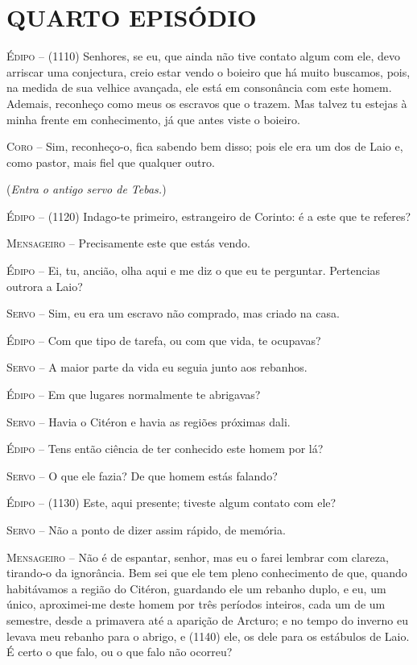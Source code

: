 \section{QUARTO EPISÓDIO}

\textsc{Édipo} --   (1110) Senhores, se eu, que ainda não tive contato algum com ele, devo
arriscar uma conjectura, creio estar vendo o boieiro que há muito
buscamos, pois, na medida de sua velhice avançada, ele está em
consonância com este homem. Ademais, reconheço como meus os escravos que
o trazem. Mas talvez tu estejas à minha frente em conhecimento, já que
antes viste o boieiro.

\textsc{Coro} --   Sim, reconheço-o, fica sabendo bem disso; pois ele era um dos de Laio e,
como pastor, mais fiel que qualquer outro.

(\emph{Entra o antigo servo de Tebas.})

\textsc{Édipo} --   (1120) Indago-te primeiro, estrangeiro de Corinto: é a este que te
referes?

\textsc{Mensageiro} --   Precisamente este que estás vendo.

\textsc{Édipo} --   Ei, tu, ancião, olha aqui e me diz o que eu te perguntar. Pertencias
outrora a Laio?

\textsc{Servo} --   Sim, eu era um escravo não comprado, mas criado na casa.

\textsc{Édipo} --   Com que tipo de tarefa, ou com que vida, te ocupavas?

\textsc{Servo} --   A maior parte da vida eu seguia junto aos rebanhos.

\textsc{Édipo} --   Em que lugares normalmente te abrigavas?

\textsc{Servo} --   Havia o Citéron e havia as regiões próximas dali.

\textsc{Édipo} --   Tens então ciência de ter conhecido este homem por lá?

\textsc{Servo} --   O que ele fazia? De que homem estás falando?

\textsc{Édipo} --   (1130) Este, aqui presente; tiveste algum contato com ele?

\textsc{Servo} --   Não a ponto de dizer assim rápido, de memória.

\textsc{Mensageiro} --   Não é de espantar, senhor, mas eu o farei lembrar com clareza, tirando-o
da ignorância. Bem sei que ele tem pleno conhecimento de que, quando
habitávamos a região do Citéron, guardando ele um rebanho duplo, e eu,
um único, aproximei-me deste homem por três períodos inteiros, cada um
de um semestre, desde a primavera até a aparição de Arcturo; e no tempo
do inverno eu levava meu rebanho para o abrigo, e (1140) ele, os dele
para os estábulos de Laio. É certo o que falo, ou o que falo não
ocorreu?

